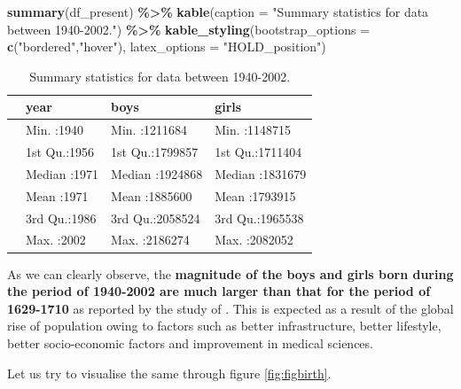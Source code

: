 \documentclass[11pt,a4paper,]{article}
\newenvironment{Shaded}{\begin{snugshade}}{\end{snugshade}}
\newcommand{\AttributeTok}[1]{\textcolor[rgb]{0.13,0.29,0.53}{#1}}
\newcommand{\FunctionTok}[1]{\textcolor[rgb]{0.13,0.29,0.53}{\textbf{#1}}}
\newcommand{\NormalTok}[1]{#1}
\newcommand{\SpecialCharTok}[1]{\textcolor[rgb]{0.81,0.36,0.00}{\textbf{#1}}}
\newcommand{\StringTok}[1]{\textcolor[rgb]{0.31,0.60,0.02}{#1}}
\begin{document}
\begin{Shaded}
\begin{Highlighting}[]
\FunctionTok{summary}\NormalTok{(df\_present) }\SpecialCharTok{\%\textgreater{}\%} \FunctionTok{kable}\NormalTok{(}\AttributeTok{caption =} \StringTok{"Summary statistics for data between 1940{-}2002."}\NormalTok{) }\SpecialCharTok{\%\textgreater{}\%} 
  \FunctionTok{kable\_styling}\NormalTok{(}\AttributeTok{bootstrap\_options =} \FunctionTok{c}\NormalTok{(}\StringTok{"bordered"}\NormalTok{,}\StringTok{"hover"}\NormalTok{),}
                                    \AttributeTok{latex\_options =} \StringTok{"HOLD\_position"}\NormalTok{) }
\end{Highlighting}
\end{Shaded}

\begin{table}[H]

\caption{\label{tab:sumstatpre}Summary statistics for data between 1940-2002.}
\centering
\begin{tabular}[t]{l|l|l|l}
\hline
  &      year &      boys &     girls\\
\hline
 & Min.   :1940 & Min.   :1211684 & Min.   :1148715\\
\hline
 & 1st Qu.:1956 & 1st Qu.:1799857 & 1st Qu.:1711404\\
\hline
 & Median :1971 & Median :1924868 & Median :1831679\\
\hline
 & Mean   :1971 & Mean   :1885600 & Mean   :1793915\\
\hline
 & 3rd Qu.:1986 & 3rd Qu.:2058524 & 3rd Qu.:1965538\\
\hline
 & Max.   :2002 & Max.   :2186274 & Max.   :2082052\\
\hline
\end{tabular}
\end{table}

\normalsize

As we can clearly observe, the \textbf{magnitude of the boys and girls born during the period of 1940-2002 are much larger than that for the period of 1629-1710} as reported by the study of \textcite{arbuthnot1710ii}. This is expected as a result of the global rise of population owing to factors such as better infrastructure, better lifestyle, better socio-economic factors and improvement in medical sciences.

Let us try to visualise the same through figure \ref{fig:figbirth}.

\tiny
\end{document}
